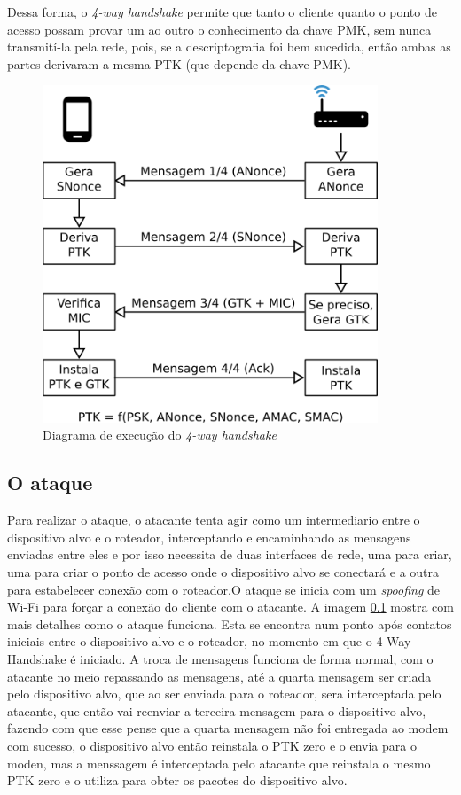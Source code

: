 \documentclass[12pt]{article}
\begin{document}
Dessa forma, o \textit{4-way handshake} permite que tanto o cliente quanto o ponto de acesso possam provar um ao outro o conhecimento da chave PMK, sem nunca transmití-la pela rede, pois, se a descriptografia foi bem sucedida, então ambas as partes derivaram a mesma PTK (que depende da chave PMK).
    

\begin{figure}[H]
	\begin{center}
    	\includegraphics[width=10cm]{Handshake.png}
    	\caption{Diagrama de execução do \textit{4-way handshake}}
    	\label{fig:handshake}
	\end{center}		
\end{figure}

\subsection{O ataque}

Para realizar o ataque, o atacante tenta agir como um intermediario entre o dispositivo alvo e o roteador,  interceptando e encaminhando as mensagens enviadas entre eles e por isso necessita de duas interfaces de rede, uma para criar, uma para criar o ponto de acesso onde o dispositivo alvo se conectará e a outra para estabelecer conexão com o roteador.O ataque se inicia com um \textit{spoofing} de Wi-Fi para forçar a conexão do cliente com o atacante. A imagem \ref{} mostra com mais detalhes como o ataque funciona. Esta se encontra num ponto após contatos iniciais entre o dispositivo alvo e o roteador, no momento em que o 4-Way-Handshake é iniciado. A troca de mensagens funciona de forma normal, com o atacante no meio repassando as mensagens, até a quarta mensagem ser criada pelo dispositivo alvo, que ao ser enviada para o roteador, sera interceptada pelo atacante, que então vai reenviar a terceira mensagem para o dispositivo alvo,  fazendo com que esse pense que a quarta mensagem não foi entregada ao modem com sucesso, o dispositivo alvo então reinstala o PTK zero e o envia para o moden, mas a menssagem é interceptada pelo atacante que reinstala o mesmo PTK zero e o utiliza para obter os pacotes do dispositivo alvo.
\end{document}
